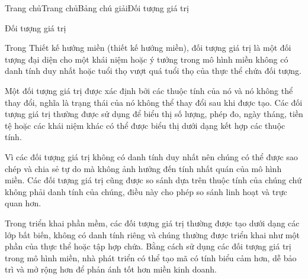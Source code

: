 










Trang chủTrang chủBảng chú giảiĐối tượng giá trị

Đối tượng giá trị

Trong Thiết kế hướng miền (thiết kế hướng miền), đối tượng giá trị là một đối tượng đại diện cho một khái niệm hoặc ý tưởng trong mô hình miền không có danh tính duy nhất hoặc tuổi thọ vượt quá tuổi thọ của thực thể chứa đối tượng.

Một đối tượng giá trị được xác định bởi các thuộc tính của nó và nó không thể thay đổi, nghĩa là trạng thái của nó không thể thay đổi sau khi được tạo. Các đối tượng giá trị thường được sử dụng để biểu thị số lượng, phép đo, ngày tháng, tiền tệ hoặc các khái niệm khác có thể được biểu thị dưới dạng kết hợp các thuộc tính.

Vì các đối tượng giá trị không có danh tính duy nhất nên chúng có thể được sao chép và chia sẻ tự do mà không ảnh hưởng đến tính nhất quán của mô hình miền. Các đối tượng giá trị cũng được so sánh dựa trên thuộc tính của chúng chứ không phải danh tính của chúng, điều này cho phép so sánh linh hoạt và trực quan hơn.

Trong triển khai phần mềm, các đối tượng giá trị thường được tạo dưới dạng các lớp bất biến, không có danh tính riêng và chúng thường được triển khai như một phần của thực thể hoặc tập hợp chứa. Bằng cách sử dụng các đối tượng giá trị trong mô hình miền, nhà phát triển có thể tạo mã có tính biểu cảm hơn, dễ bảo trì và mở rộng hơn để phản ánh tốt hơn miền kinh doanh.

